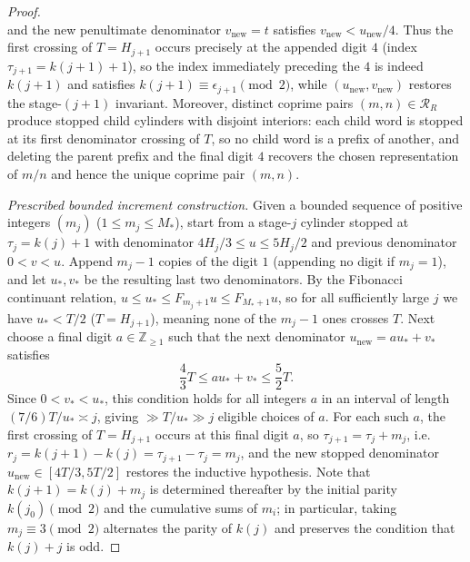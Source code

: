 \documentclass[11pt]{article}
\theoremstyle{definition}
\theoremstyle{remark}
\newcommand{\Z}{\mathbb{Z}}
\begin{document}
\begin{proof}
\[\]
and the new penultimate denominator $v_{\mathrm{new}}=t$ satisfies
$v_{\mathrm{new}}<u_{\mathrm{new}}/4$. Thus the first crossing of $T=H_{j+1}$
occurs precisely at the appended digit $4$ (index $\tau_{j+1}=k(j+1)+1$), so the
index immediately preceding the $4$ is indeed $k(j+1)$ and satisfies
$k(j+1)\equiv\epsilon_{j+1}\pmod2$, while $(u_{\mathrm{new}},v_{\mathrm{new}})$
restores the stage-$(j+1)$ invariant. Moreover, distinct coprime pairs
$(m,n)\in\mathcal R_R$ produce stopped child cylinders with disjoint interiors:
each child word is stopped at its first denominator crossing of $T$, so no child
word is a prefix of another, and deleting the parent prefix and the final digit
$4$ recovers the chosen representation of $m/n$ and hence the unique coprime
pair $(m,n)$.

\emph{Prescribed bounded increment construction.} Given a bounded sequence of
positive integers $(m_j)$ ($1\le m_j\le M_*$), start from a stage-$j$ cylinder
stopped at $\tau_j=k(j)+1$ with denominator $4H_j/3\le u\le5H_j/2$ and previous
denominator $0<v<u$. Append $m_j-1$ copies of the digit $1$ (appending no digit
if $m_j=1$), and let $u_*,v_*$ be the resulting last two denominators. By the
Fibonacci continuant relation, $u\le u_*\le F_{m_j+1}u\le F_{M_*+1}u$, so for all
sufficiently large $j$ we have $u_*<T/2$ ($T=H_{j+1}$), meaning none of the
$m_j-1$ ones crosses $T$. Next choose a final digit $a\in\Z_{\ge1}$ such that
the next denominator $u_{\mathrm{new}}=au_*+v_*$ satisfies
\[
\frac43 T\le au_*+v_*\le\frac52 T.
\]
Since $0<v_*<u_*$, this condition holds for all integers $a$ in an interval of
length $(7/6)T/u_*\asymp j$, giving $\gg T/u_*\gg j$ eligible choices of $a$.
For each such $a$, the first crossing of $T=H_{j+1}$ occurs at this final digit
$a$, so $\tau_{j+1}=\tau_j+m_j$, i.e.\ $r_j=k(j+1)-k(j)=\tau_{j+1}-\tau_j=m_j$,
and the new stopped denominator $u_{\mathrm{new}}\in[4T/3,5T/2]$ restores the
inductive hypothesis. Note that $k(j+1)=k(j)+m_j$ is determined thereafter by
the initial parity $k(j_0)\pmod2$ and the cumulative sums of $m_i$; in
particular, taking $m_j\equiv3\pmod2$ alternates the parity of $k(j)$ and
preserves the condition that $k(j)+j$ is odd.


\end{proof}
\end{document}
